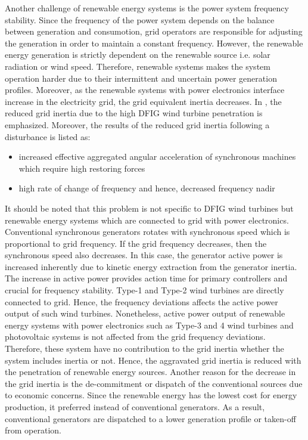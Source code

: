 Another challenge of renewable energy systems  is the power system frequency stability. Since the frequency of the power system depends on the balance between generation and consumotion, grid operators are responsible for adjusting the generation in order to maintain a constant frequency. However, the renewable energy generation is strictly dependent on the renewable source i.e. solar radiation or wind speed. Therefore, renewable systems makes the system operation harder due to their intermittent and uncertain power generation profiles. Moreover, as the renewable systems with power electronics interface increase in the electricity grid, the grid equivalent inertia decreases. In \cite{Gautam2011}, the reduced grid inertia due to the high DFIG wind turbine penetration is emphasized. Moreover, the results of the reduced grid inertia following a disturbance is listed as: 

\begin{itemize}
	\item increased effective aggregated angular acceleration of synchronous machines which require high restoring forces
	\item high rate of change of frequency and hence, decreased frequency nadir
\end{itemize}

It should be noted that this problem is not specific to DFIG wind turbines but renewable energy systems which are connected to grid with power electronics. Conventional synchronous generators rotates with synchronous speed which is proportional to grid frequency. If the grid frequency decreases, then the synchronous speed also decreases. In this case, the generator active power is increased inherently due to kinetic energy extraction from the generator inertia. The increase in active power provides action time for primary controllers and crucial for frequency stability. Type-1 and Type-2 wind turbines are directly connected to grid. Hence, the frequency deviations affects the active power output of such wind turbines\cite{Muljadi2012}. Nonetheless, active power output of renewable energy systems with power electronics such as Type-3 and 4 wind turbines and photovoltaic systems is not affected from the grid frequency deviations. Therefore, these system have no contribution to the grid inertia whether the system includes inertia or not. Hence, the aggravated grid inertia is reduced with the penetration of renewable energy sources. Another reason for the decrease in the grid inertia is the de-commitment or dispatch of the conventional sources due to economic concerns. Since the renewable energy has the lowest cost for energy production, it preferred instead of conventional generators. As a result, conventional generators are dispatched to a lower generation profile or taken-off from operation. 

